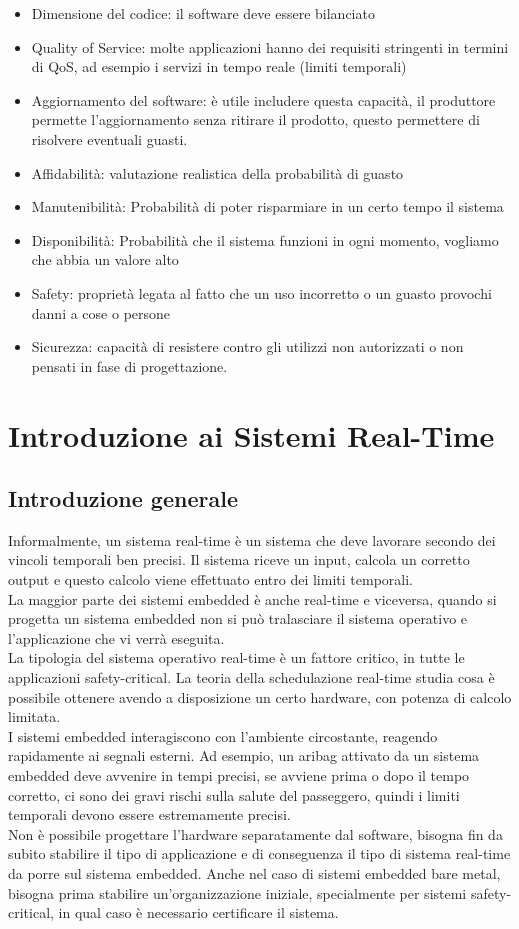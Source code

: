\documentclass[12pt, oneside]{extbook}
\begin{document}
\begin{itemize}
\item Dimensione del codice: il software deve essere bilanciato
\item Quality of Service: molte applicazioni hanno dei requisiti stringenti in termini di QoS, ad esempio i servizi in tempo reale (limiti temporali)
\item Aggiornamento del software: è utile includere questa capacità, il produttore permette l'aggiornamento senza ritirare il prodotto, questo permettere di risolvere eventuali guasti.
\item Affidabilità: valutazione realistica della probabilità di guasto
\item Manutenibilità: Probabilità di poter risparmiare in un certo tempo il sistema
\item Disponibilità: Probabilità che il sistema funzioni in ogni momento, vogliamo che abbia un valore alto
\item Safety: proprietà legata al fatto che un uso incorretto o un guasto provochi danni a cose o persone
\item Sicurezza: capacità di resistere contro gli utilizzi non autorizzati o non pensati in fase di progettazione. 
\end{itemize}
\chapter{Introduzione ai Sistemi Real-Time}
\section{Introduzione generale}
Informalmente, un sistema real-time è un sistema che deve lavorare secondo dei vincoli temporali ben precisi. Il sistema riceve un input, calcola un corretto output e questo calcolo viene effettuato entro dei limiti temporali.\\ La maggior parte dei sistemi embedded è anche real-time e viceversa, quando si progetta un sistema embedded non si può tralasciare il sistema operativo e l'applicazione che vi verrà eseguita.\\ La tipologia del sistema operativo real-time è un fattore critico, in tutte le applicazioni safety-critical. La teoria della schedulazione real-time studia cosa è possibile ottenere avendo a disposizione un certo hardware, con potenza di calcolo limitata.\\ I sistemi embedded interagiscono con l'ambiente circostante, reagendo rapidamente ai segnali esterni. Ad esempio, un aribag attivato da un sistema embedded deve avvenire in tempi precisi, se avviene prima o dopo il tempo corretto, ci sono dei gravi rischi sulla salute del passeggero, quindi i limiti temporali devono essere estremamente precisi.\\ Non è possibile progettare l'hardware separatamente dal software, bisogna fin da subito stabilire il tipo di applicazione e di conseguenza il tipo di sistema real-time da porre sul sistema embedded. Anche nel caso di sistemi embedded bare metal, bisogna prima stabilire un'organizzazione iniziale, specialmente per sistemi safety-critical, in qual caso è necessario certificare il sistema.
\end{document}
